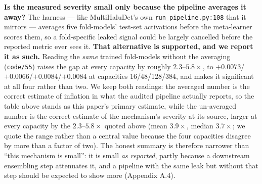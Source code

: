 \documentclass[10pt]{article} %
\begin{document}
\textbf{Is the measured severity small only because the pipeline averages it
away?} The harness --- like MultiHaluDet's own \texttt{run\_pipeline.py:108}
that it mirrors --- averages five fold-models' test-set activations before the
meta-learner scores them, so a fold-specific leaked signal could be largely
cancelled before the reported metric ever sees it. \textbf{That alternative is
supported, and we report it as such.} Reading the \emph{same} trained
fold-models without the averaging (\texttt{code/55}) raises the gap at every
capacity by roughly $2.3$--$5.8\times$, to
$+0.0073$/$+0.0066$/$+0.0084$/$+0.0084$ at capacities 16/48/128/384, and makes
it significant at all four rather than two. We keep both readings: the averaged
number is the correct estimate of inflation in what the audited pipeline
actually reports, so the table above stands as this paper's primary estimate,
while the un-averaged number is the correct estimate of the mechanism's
severity at its source, larger at every capacity by the
$2.3$--$5.8\times$ quoted above (mean $3.9\times$, median $3.7\times$; we quote
the range rather than a central value because the four capacities disagree
by more than a factor of two). The honest summary is therefore
narrower than ``this mechanism is small'': it is small \emph{as reported},
partly because a downstream ensembling step attenuates it, and a pipeline with
the same leak but without that step should be expected to show more
(Appendix A.4).
\end{document}
